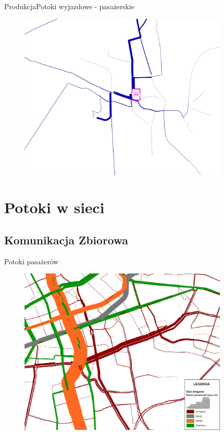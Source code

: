 \documentclass[8pt]{beamer}
\begin{document}
\begin{frame}{Produkcja}{Potoki wyjazdowe - pasażerskie}
\begin{figure}\begin{center}
\includegraphics[width=0.9\textwidth]{zone_bundle_PuT}
 \end{center}  \end{figure} 
\end{frame}

\section{Potoki w sieci}
\subsection{Komunikacja Zbiorowa}
\begin{frame}{Potoki pasażerów}
\begin{figure}\begin{center}
\includegraphics[width=0.9\textwidth]{put_flows1}
 \end{center}  \end{figure} 
\end{frame}
\end{document}
